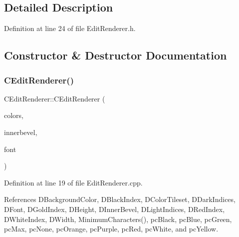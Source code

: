 \subsection{Detailed Description}


Definition at line 24 of file Edit\+Renderer.\+h.



\subsection{Constructor \& Destructor Documentation}
\hypertarget{classCEditRenderer_a672139544dacbe5fb75dd30663a0bc0b}{}\label{classCEditRenderer_a672139544dacbe5fb75dd30663a0bc0b} 
\subsubsection{\texorpdfstring{C\+Edit\+Renderer()}{CEditRenderer()}}
{\footnotesize\ttfamily C\+Edit\+Renderer\+::\+C\+Edit\+Renderer (\begin{DoxyParamCaption}\item[{std\+::shared\+\_\+ptr$<$ \hyperlink{classCGraphicTileset}{C\+Graphic\+Tileset} $>$}]{colors,  }\item[{std\+::shared\+\_\+ptr$<$ \hyperlink{classCBevel}{C\+Bevel} $>$}]{innerbevel,  }\item[{std\+::shared\+\_\+ptr$<$ \hyperlink{classCFontTileset}{C\+Font\+Tileset} $>$}]{font }\end{DoxyParamCaption})}



Definition at line 19 of file Edit\+Renderer.\+cpp.



References D\+Background\+Color, D\+Black\+Index, D\+Color\+Tileset, D\+Dark\+Indices, D\+Font, D\+Gold\+Index, D\+Height, D\+Inner\+Bevel, D\+Light\+Indices, D\+Red\+Index, D\+White\+Index, D\+Width, Minimum\+Characters(), pc\+Black, pc\+Blue, pc\+Green, pc\+Max, pc\+None, pc\+Orange, pc\+Purple, pc\+Red, pc\+White, and pc\+Yellow.


